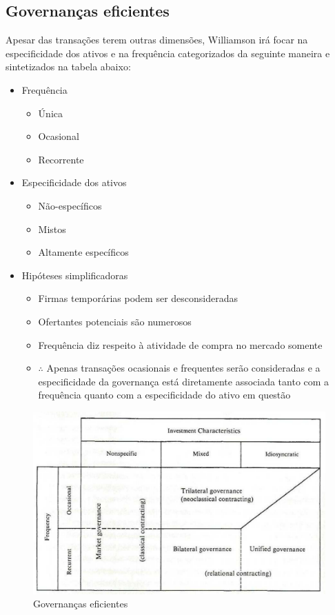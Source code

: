 \subsection*{Governanças eficientes}

Apesar das transações terem outras dimensões, Williamson irá focar na especificidade dos ativos e na frequência categorizados da seguinte maneira e sintetizados na tabela abaixo:

\begin{itemize}
	\item Frequência
	\begin{itemize}
		\item Única
		\item Ocasional
		\item Recorrente
	\end{itemize}
	\item Especificidade dos ativos
	\begin{itemize}
		\item Não-específicos
		\item Mistos
		\item Altamente específicos
	\end{itemize}
	\item Hipóteses simplificadoras
	\begin{itemize}
		\item Firmas temporárias podem ser desconsideradas
		\item Ofertantes potenciais são numerosos
		\item Frequência diz respeito à atividade de compra no mercado somente
		\item $\therefore$ Apenas transações ocasionais e frequentes serão consideradas e a especificidade da governança está diretamente associada tanto com a frequência quanto com a especificidade do ativo em questão
	\end{itemize}
\end{itemize}

\begin{figure}[h]
	\centering
	\caption{Governanças eficientes}
	\label{fig:screenshot007}
	\includegraphics[width=0.7\linewidth]{screenshot007}
\end{figure}




